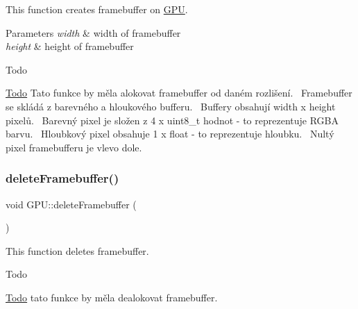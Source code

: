 This function creates framebuffer on \hyperlink{classGPU}{G\+PU}. 


\begin{DoxyParams}{Parameters}
{\em width} & width of framebuffer \\
\hline
{\em height} & height of framebuffer \\
\hline
\end{DoxyParams}
\begin{DoxyRefDesc}{Todo}
\item[\hyperlink{todo__todo000028}{Todo}]Tato funkce by měla alokovat framebuffer od daném rozlišení.~\newline
 Framebuffer se skládá z barevného a hloukového bufferu.~\newline
 Buffery obsahují width x height pixelů.~\newline
 Barevný pixel je složen z 4 x uint8\+\_\+t hodnot -\/ to reprezentuje R\+G\+BA barvu.~\newline
 Hloubkový pixel obsahuje 1 x float -\/ to reprezentuje hloubku.~\newline
 Nultý pixel framebufferu je vlevo dole.~\newline
 \end{DoxyRefDesc}
\mbox{\label{group__framebuffer__tasks_gaaaa9fbf5f3c28f27f092c2c6883d6e60}} 
\subsubsection{\texorpdfstring{delete\+Framebuffer()}{deleteFramebuffer()}}
{\footnotesize\ttfamily void G\+P\+U\+::delete\+Framebuffer (\begin{DoxyParamCaption}{ }\end{DoxyParamCaption})}



This function deletes framebuffer. 

\begin{DoxyRefDesc}{Todo}
\item[\hyperlink{todo__todo000029}{Todo}]tato funkce by měla dealokovat framebuffer. \end{DoxyRefDesc}
\mbox{\label{group__framebuffer__tasks_ga67504b8136ef6283ad6efbb5323a0ef8}} 
